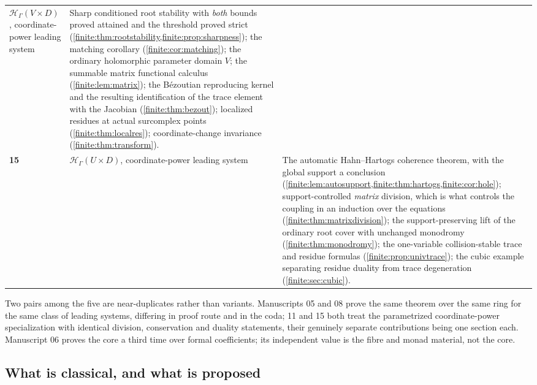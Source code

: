 \documentclass[11pt,letterpaper]{article}
\theoremstyle{definition}
\theoremstyle{remark}
\newcommand{\HH}{\mathscr H}
\numberwithin{equation}{section}
\begin{document}
\begin{center}
\begin{longtable}{@{}L{0.09\textwidth}L{0.30\textwidth}L{0.55\textwidth}@{}}
$\HH_\Gamma(V\times D)$, coordinate-power leading system &
Sharp conditioned root stability with \emph{both} bounds proved attained and the threshold proved strict (\cref{finite:thm:rootstability,finite:prop:sharpness}); the matching corollary (\cref{finite:cor:matching}); the ordinary holomorphic parameter domain $V$; the summable matrix functional calculus (\cref{finite:lem:matrix}); the B\'ezoutian reproducing kernel and the resulting identification of the trace element with the Jacobian (\cref{finite:thm:bezout}); localized residues at actual surcomplex points (\cref{finite:thm:localres}); coordinate-change invariance (\cref{finite:thm:transform}).\\[0.35em]
\textbf{15} &
$\HH_\Gamma(U\times D)$, coordinate-power leading system &
The automatic Hahn--Hartogs coherence theorem, with the global support a conclusion (\cref{finite:lem:autosupport,finite:thm:hartogs,finite:cor:hole}); support-controlled \emph{matrix} division, which is what controls the coupling in an induction over the equations (\cref{finite:thm:matrixdivision}); the support-preserving lift of the ordinary root cover with unchanged monodromy (\cref{finite:thm:monodromy}); the one-variable collision-stable trace and residue formulas (\cref{finite:prop:univtrace}); the cubic example separating residue duality from trace degeneration (\cref{finite:sec:cubic}).\\
\bottomrule
\end{longtable}
\end{center}

Two pairs among the five are near-duplicates rather than variants. Manuscripts 05 and 08 prove the same theorem over the same ring for the same class of leading systems, differing in proof route and in the coda; 11 and 15 both treat the parametrized coordinate-power specialization with identical division, conservation and duality statements, their genuinely separate contributions being one section each. Manuscript 06 proves the core a third time over formal coefficients; its independent value is the fibre and monad material, not the core.

\subsection{What is classical, and what is proposed}
\label{finite:sec:classical}
\end{document}
